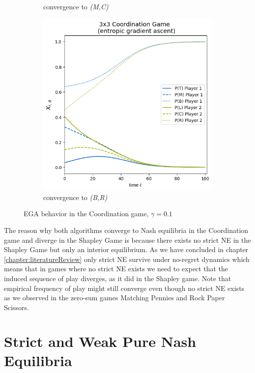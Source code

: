 \begin{figure}[H]
\begin{subfigure}{.5\textwidth}
    \caption{convergence to \textit{(M,C)}}
    \label{fig:Coordination3x3b}
\end{subfigure}
\begin{subfigure}{.5\textwidth}
    \centering
    \includegraphics[width=\textwidth]{logos/Coordination3x3-3.png}
    \caption{convergence to \textit{(B,R)}}
    \label{fig:Coordination3x3c}
\end{subfigure}%
\caption{EGA behavior in the Coordination game, $\gamma = 0.1$}
\label{fig:Coordination3x3}
\end{figure}

The reason why both algorithms converge to Nash equilibria in the Coordination game and diverge in the Shapley Game is because there exists no strict NE in the Shapley Game but only an interior equilibrium. As we have concluded in chapter \ref{chapter:literatureReview} only strict NE survive under no-regret dynamics which means that in games where no strict NE exists we need to expect that the induced sequence of play diverges, as it did in the Shapley game. Note that empirical frequency of play might still converge even though no strict NE exists as we observed in the zero-sum games Matching Pennies and Rock Paper Scissors. 


\section{Strict and Weak Pure Nash Equilibria}\label{section:StrictandWeakPureNashEquilibria}

